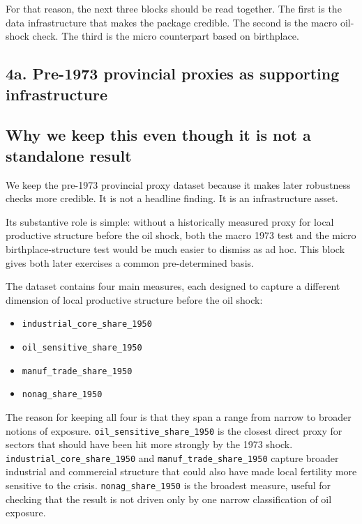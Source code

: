 \documentclass[11pt]{article}
\begin{document}
For that reason, the next three blocks should be read together. The first is the data infrastructure that makes the package credible. The second is the macro oil-shock check. The third is the micro counterpart based on birthplace.

\subsection*{4a. Pre-1973 provincial proxies as supporting infrastructure}\label{sec:oilshock-4a}

\subsection*{Why we keep this even though it is not a standalone result}

We keep the pre-1973 provincial proxy dataset because it makes later robustness checks more credible. It is not a headline finding. It is an infrastructure asset.

Its substantive role is simple: without a historically measured proxy for local productive structure before the oil shock, both the macro 1973 test and the micro birthplace-structure test would be much easier to dismiss as ad hoc. This block gives both later exercises a common pre-determined basis.

The dataset contains four main measures, each designed to capture a different dimension of local productive structure before the oil shock:
\begin{itemize}[leftmargin=*]
\item \texttt{industrial\_core\_share\_1950}
\item \texttt{oil\_sensitive\_share\_1950}
\item \texttt{manuf\_trade\_share\_1950}
\item \texttt{nonag\_share\_1950}
\end{itemize}

The reason for keeping all four is that they span a range from narrow to broader notions of exposure. \texttt{oil\_sensitive\_share\_1950} is the closest direct proxy for sectors that should have been hit more strongly by the 1973 shock. \texttt{industrial\_core\_share\_1950} and \texttt{manuf\_trade\_share\_1950} capture broader industrial and commercial structure that could also have made local fertility more sensitive to the crisis. \texttt{nonag\_share\_1950} is the broadest measure, useful for checking that the result is not driven only by one narrow classification of oil exposure.
\end{document}
